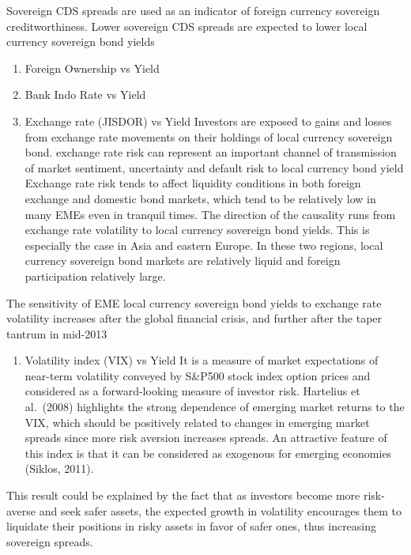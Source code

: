 \documentclass[11pt,a4paper,]{article}
\providecommand{\tightlist}{%
  \setlength{\itemsep}{0pt}\setlength{\parskip}{0pt}}
\begin{document}
Sovereign CDS spreads are used as an indicator of foreign currency sovereign
creditworthiness. Lower sovereign CDS spreads are expected to lower local currency sovereign bond yields \textcite{gadanecz}

\begin{enumerate}
\def\labelenumi{\alph{enumi}.}
\setcounter{enumi}{2}
\item
  Foreign Ownership vs Yield
\item
  Bank Indo Rate vs Yield
\item
  Exchange rate (JISDOR) vs Yield
  Investors are exposed to gains and losses from exchange rate movements on their holdings of local currency sovereign bond. exchange rate risk can represent an important channel of transmission of market sentiment, uncertainty and default risk to local currency bond yield
  Exchange rate risk tends to affect liquidity
  conditions in both foreign exchange and domestic bond markets, which tend to be relatively low in many EMEs even in tranquil times.
  The direction of the
  causality runs from exchange rate volatility to local currency sovereign bond yields. This is especially the case in Asia and eastern
  Europe. In these two regions, local currency sovereign bond markets are relatively liquid and foreign participation relatively large.
\end{enumerate}

The sensitivity of EME local currency sovereign bond yields to exchange rate volatility increases after
the global financial crisis, and further after the taper tantrum in mid-2013
\textcite{gadanecz}

\begin{enumerate}
\def\labelenumi{\alph{enumi}.}
\setcounter{enumi}{5}
\tightlist
\item
  Volatility index (VIX) vs Yield
  It is a measure of market expectations of near-term volatility conveyed by S\&P500 stock index option prices and considered as a forward-looking measure of investor risk. Hartelius et al.~(2008) highlights the strong dependence of emerging market returns to the VIX, which should be positively
  related to changes in emerging market spreads since more risk aversion increases spreads. An attractive feature of this index is that it can
  be considered as exogenous for emerging economies (Siklos, 2011). \textcite{hajer}
\end{enumerate}

This result could be explained by the fact that as investors become more risk-averse and seek safer assets, the expected growth in volatility encourages them to liquidate their positions in risky assets in favor of safer ones, thus increasing sovereign spreads.
\textcite{hajer}
\end{document}
